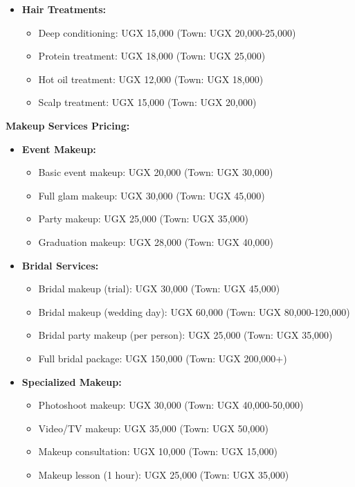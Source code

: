 \begin{itemize}[leftmargin=2em]
    \item \textbf{Hair Treatments:}
    \begin{itemize}
        \item Deep conditioning: UGX 15,000 (Town: UGX 20,000-25,000)
        \item Protein treatment: UGX 18,000 (Town: UGX 25,000)
        \item Hot oil treatment: UGX 12,000 (Town: UGX 18,000)
        \item Scalp treatment: UGX 15,000 (Town: UGX 20,000)
    \end{itemize}
\end{itemize}

\textbf{Makeup Services Pricing:}
\begin{itemize}[leftmargin=2em]
    \item \textbf{Event Makeup:}
    \begin{itemize}
        \item Basic event makeup: UGX 20,000 (Town: UGX 30,000)
        \item Full glam makeup: UGX 30,000 (Town: UGX 45,000)
        \item Party makeup: UGX 25,000 (Town: UGX 35,000)
        \item Graduation makeup: UGX 28,000 (Town: UGX 40,000)
    \end{itemize}
    
    \item \textbf{Bridal Services:}
    \begin{itemize}
        \item Bridal makeup (trial): UGX 30,000 (Town: UGX 45,000)
        \item Bridal makeup (wedding day): UGX 60,000 (Town: UGX 80,000-120,000)
        \item Bridal party makeup (per person): UGX 25,000 (Town: UGX 35,000)
        \item Full bridal package: UGX 150,000 (Town: UGX 200,000+)
    \end{itemize}
    
    \item \textbf{Specialized Makeup:}
    \begin{itemize}
        \item Photoshoot makeup: UGX 30,000 (Town: UGX 40,000-50,000)
        \item Video/TV makeup: UGX 35,000 (Town: UGX 50,000)
        \item Makeup consultation: UGX 10,000 (Town: UGX 15,000)
        \item Makeup lesson (1 hour): UGX 25,000 (Town: UGX 35,000)
    \end{itemize}
\end{itemize}

